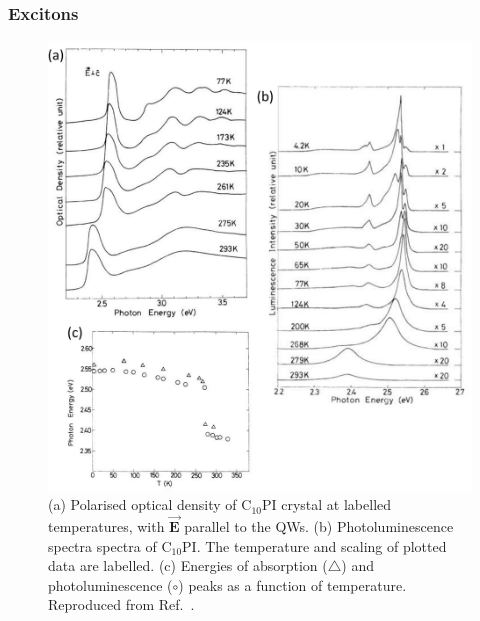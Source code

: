 \subsubsection{Excitons}
\begin{figure}[h!]
\centering
\includegraphics[width=\textwidth]{Fig13}
\caption{(a) Polarised optical density of $\textrm{C}_{10}$PI crystal at labelled temperatures, with $\vec{\mathbf{E}}$ parallel to the QWs. (b) Photoluminescence spectra spectra of $\textrm{C}_{10}$PI. The temperature and scaling of plotted data are labelled. (c) Energies of absorption ($\triangle$) and photoluminescence ($\circ$) peaks as a function of temperature. Reproduced from Ref.\ \cite{Ishihara1990}.}
\label{2Fig13}
\end{figure}
